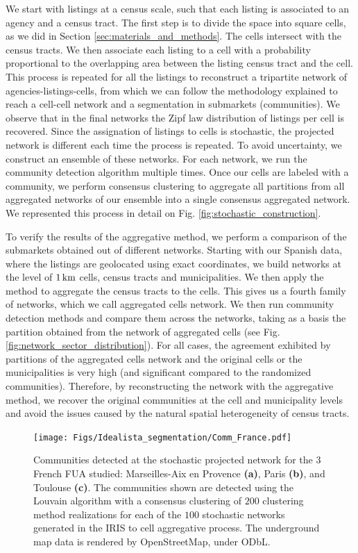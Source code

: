 We start with listings at a census scale, such that each listing is associated to an agency and a census tract. The first step is to divide the space into square cells, as we did in Section \ref{sec:materials_and_methods}. The cells intersect with the census tracts. We then associate each listing to a cell with a probability proportional to the overlapping area between the listing census tract and the cell. This process is repeated for all the listings to reconstruct a tripartite network of agencies-listings-cells, from which we can follow the methodology explained to reach a cell-cell network and a segmentation in submarkets (communities). 
We observe that in the final networks the Zipf law distribution of listings per cell is recovered.
Since the assignation of listings to cells is stochastic, the projected network is different each time the process is repeated. To avoid uncertainty, we construct an ensemble of these networks. For each network, we run the community detection algorithm multiple times. Once our cells are labeled with a community, we perform consensus clustering to aggregate all partitions from all aggregated networks of our ensemble into a single consensus aggregated network. We represented this process in detail on Fig. \ref{fig:stochastic_construction}.

To verify the results of the aggregative method, we perform a comparison of the submarkets obtained out of different networks. Starting with our Spanish data, where the listings are geolocated using exact coordinates, we build networks at the level of $1 \, \rm{km}$ cells, census tracts and municipalities. We then apply the method to aggregate the census tracts to the cells. This gives us a fourth family of networks, which we call aggregated cells network. We then run community detection methods and compare them across the networks, taking as a basis the partition obtained from the network of aggregated cells (see Fig. \ref{fig:network_sector_distribution}). For all cases, the agreement exhibited by partitions of the aggregated cells network and the original cells or the municipalities is very high (and significant compared to the randomized communities). Therefore, by reconstructing the network with the aggregative method, we recover the original communities at the cell and municipality levels and avoid the issues caused by the natural spatial heterogeneity of census tracts.

\begin{figure}[t]
    \centering
    \texttt{[image: Figs/Idealista\_segmentation/Comm\_France.pdf]}
	\caption[Spatial segmentation for $1 \; \textrm{km}$ aggregated cells constructed from IRIS level data for France.]{ Communities detected at the stochastic projected network for the 3 French FUA studied: Marseilles-Aix en Provence \textbf{(a)}, Paris \textbf{(b)}, and Toulouse \textbf{(c)}. The communities shown are detected using the Louvain algorithm with a consensus clustering of $200$ clustering method realizations for each of the $100$ stochastic networks generated in the IRIS to cell aggregative process. The underground map data is rendered by OpenStreetMap, under ODbL. \label{fig:france_comm}}
\end{figure}

